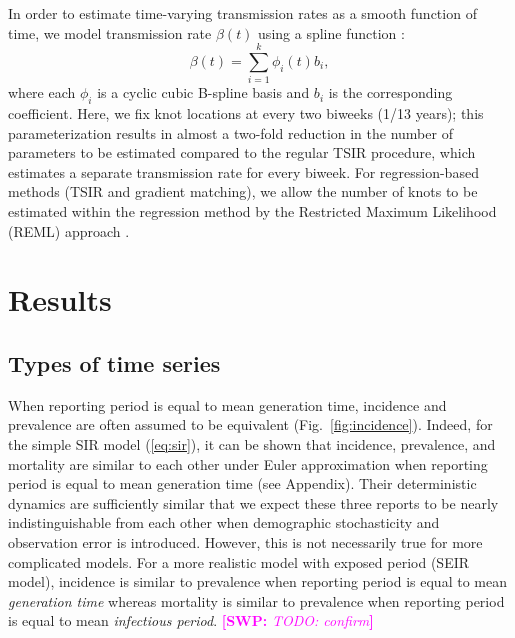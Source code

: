 \documentclass{article}
\newcommand{\eref}[1]{(\ref{eq:#1})}
\newcommand{\fref}[1]{Fig.~\ref{fig:#1}}
\newcommand{\comment}[3]{\textcolor{#1}{\textbf{[#2: }\textsl{#3}\textbf{]}}}
\newcommand{\swp}[1]{\comment{magenta}{SWP}{#1}}
\begin{document}
In order to estimate time-varying transmission rates as a smooth function of time, we model transmission rate $\beta(t)$ using a spline function \citep{hooker2010parameterizing}:
\begin{equation}
\beta(t) = \sum_{i=1}^k \phi_i(t) b_i,
\end{equation}
where each $\phi_i$ is a cyclic cubic B-spline basis and $b_i$ is the corresponding coefficient.
Here, we fix knot locations at every two biweeks (1/13 years);
this parameterization results in almost a two-fold reduction in the number of parameters to be estimated compared to the regular TSIR procedure, which estimates a separate transmission rate for every biweek.
For regression-based methods (TSIR and gradient matching), we allow the number of knots to be estimated within the regression method by the Restricted Maximum Likelihood (REML) approach \citep{wood2012mgcv}.

\section{Results}

\subsection{Types of time series}

When reporting period is equal to mean generation time, incidence and prevalence are often assumed to be equivalent (\fref{incidence}).
Indeed, for the simple SIR model \eref{sir}, it can be shown that incidence, prevalence, and mortality are similar to each other under Euler approximation when reporting period is equal to mean generation time (see Appendix).
Their deterministic dynamics are sufficiently similar that we expect these three reports to be nearly indistinguishable from each other when demographic stochasticity and observation error is introduced.
However, this is not necessarily true for more complicated models.
For a more realistic model with exposed period (SEIR model), incidence is similar to prevalence when reporting period is equal to mean \emph{generation time} whereas mortality is similar to prevalence when reporting period is equal to mean \emph{infectious period}. \swp{TODO: confirm}
\end{document}
